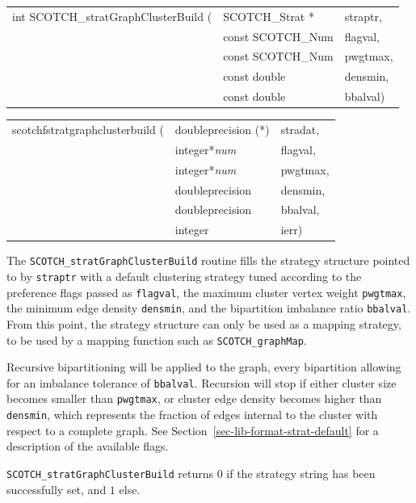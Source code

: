 \begin{itemize}
\progsyn

{\tt\begin{tabular}{l@{}ll}
int SCOTCH\_stratGraphClusterBuild ( & SCOTCH\_Strat *   & straptr, \\
                                     & const SCOTCH\_Num & flagval, \\
                                     & const SCOTCH\_Num & pwgtmax, \\
                                     & const double      & densmin, \\
                                     & const double      & bbalval)
\end{tabular}}

{\tt\begin{tabular}{l@{}ll}
scotchfstratgraphclusterbuild ( & doubleprecision (*) & stradat, \\
                                & integer*{\it num}   & flagval, \\
                                & integer*{\it num}   & pwgtmax, \\
                                & doubleprecision     & densmin, \\
                                & doubleprecision     & bbalval, \\
                                & integer             & ierr)
\end{tabular}}

\progdes

The {\tt SCOTCH\_stratGraphClusterBuild} routine fills the strategy
structure pointed to by {\tt straptr} with a default clustering
strategy tuned according to the preference flags passed as
{\tt flagval}, the maximum cluster vertex weight {\tt pwgtmax},
the minimum edge density {\tt densmin}, and the bipartition imbalance
ratio {\tt bbalval}. From this point, the strategy structure
can only be used as a mapping strategy, to be used by a mapping
function such as {\tt SCOTCH\_\lbt graph\lbt Map}.

Recursive bipartitioning will be applied to the graph, every
bipartition allowing for an imbalance tolerance of {\tt bbalval}.
Recursion will stop if either cluster size becomes smaller than
{\tt pwgtmax}, or cluster edge density becomes higher than
{\tt densmin}, which represents the fraction of edges internal to the
cluster with respect to a complete graph. See
Section~\ref{sec-lib-format-strat-default} for a description of the
available flags.

\progret

{\tt SCOTCH\_stratGraphClusterBuild} returns $0$ if the strategy string
has been successfully set, and $1$ else.
\end{itemize}

